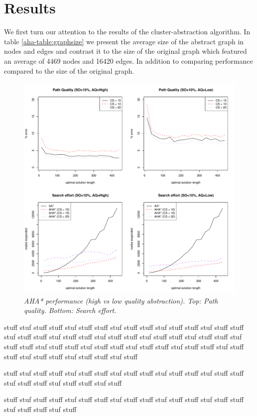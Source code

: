 \section{Results}
We first turn our attention to the results of the cluster-abstraction algorithm. 
In table \ref{aha-table:graphsize} we present the average size of the abstract graph in nodes and edges and contrast it to the size of the original graph which featured an average of 4469 nodes and 16420 edges. In addition to comparing performance 
compared to the size of the original graph. 
\begin{figure}[htbp]
       \caption{\emph{AHA* performance (high vs low quality abstraction). Top: Path quality. Bottom: Search effort. }}
       \begin{center}
                       \includegraphics[scale=0.35]{diagrams/allgraphs.pdf}
       \end{center}
       \label{aha-fig:allgraphs}
\end{figure}

stuff stuf stuff
stuff stuf stuff
stuff stuf stuff
stuff stuf stuff
stuff stuf stuff
stuff stuf stuff
stuff stuf stuff
stuff stuf stuff
stuff stuf stuff
stuff stuf stuff
stuff stuf stuff
stuff stuf stuff
stuff stuf stuff
stuff stuf stuff
stuff stuf stuff
stuff stuf stuff
stuff stuf stuff
stuff stuf stuff
stuff stuf stuff

stuff stuf stuff
stuff stuf stuff
stuff stuf stuff
stuff stuf stuff
stuff stuf stuff
stuff stuf stuff
stuff stuf stuff
stuff stuf stuff

stuff stuf stuff
stuff stuf stuff
stuff stuf stuff
stuff stuf stuff
stuff stuf stuff
stuff stuf stuff
stuff stuf stuff
